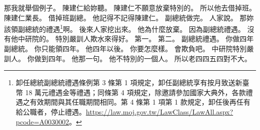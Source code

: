 \hypertarget{c01:cue:3480}{}那我就舉個例子。
\hypertarget{c01:cue:3481}{}陳建仁給妳聽。
\hypertarget{c01:cue:3482}{}陳建仁不願意放棄特別的。
\hypertarget{c01:cue:3483}{}所以他去借掉班。
\hypertarget{c01:cue:3484}{}陳建仁業長。
\hypertarget{c01:cue:3485}{}借掉班副總。
\hypertarget{c01:cue:3486}{}他記得不記得陳建仁。
\hypertarget{c01:cue:3487}{}副總統做完。
\hypertarget{c01:cue:3488}{}人家說。
\hypertarget{c01:cue:3489}{}那妳該領副總統的禮遇\footnote{卸任總統副總統禮遇條例第 3 條第 1 項規定，卸任副總統享有按月致送新臺幣 18 萬元禮遇金等禮遇；同條第 4 項規定，除邀請參加國家大典外，各款禮遇之有效期間與其任職期間相同。第 4 條第 1 項第 1 款規定，卸任後再任有給公職者，停止禮遇。\url{https://law.moj.gov.tw/LawClass/LawAll.aspx?pcode=A0030002}。}啊。
\hypertarget{c01:cue:3490}{}後來人家挖出來。
\hypertarget{c01:cue:3491}{}他為什麼放棄。
\hypertarget{c01:cue:3492}{}因為副總統禮遇。
\hypertarget{c01:cue:3493}{}沒有他中研院的。
\hypertarget{c01:cue:3494}{}特別嚴訓人欺水來得好。
\hypertarget{c01:cue:3495}{}第一。
\hypertarget{c01:cue:3496}{}第二。
\hypertarget{c01:cue:3497}{}副總統禮遇。
\hypertarget{c01:cue:3498}{}你做四年副總統。
\hypertarget{c01:cue:3499}{}你只能領四年。
\hypertarget{c01:cue:3500}{}他四年以後。
\hypertarget{c01:cue:3501}{}你要怎麼樣。
\hypertarget{c01:cue:3502}{}會欺負吧。
\hypertarget{c01:cue:3503}{}中研院特別嚴訓人。
\hypertarget{c01:cue:3504}{}你做到四年。
\hypertarget{c01:cue:3505}{}他那一句。
\hypertarget{c01:cue:3506}{}他不特別的一個人。
\hypertarget{c01:cue:3507}{}所以老四四五四對不大。

